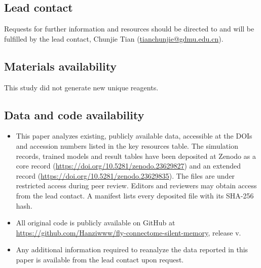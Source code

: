 \subsection{Lead contact}
Requests for further information and resources should be directed to and will be fulfilled by the lead contact, Chunjie Tian
(\href{mailto:tianchunjie@gdmu.edu.cn}{tianchunjie@gdmu.edu.cn}).

\subsection{Materials availability}
This study did not generate new unique reagents.

\subsection{Data and code availability}
\begin{itemize}
  \item This paper analyzes existing, publicly available data, accessible at the DOIs and accession numbers listed in the key
  resources table. The simulation records, trained models and result tables have been deposited at Zenodo as a core record
  (\url{https://doi.org/10.5281/zenodo.23629827}) and an extended record (\url{https://doi.org/10.5281/zenodo.23629835}). The files are under restricted access
  during peer review. Editors and reviewers may obtain access from the lead contact. A manifest lists every deposited file
  with its SHA-256 hash.
  \item All original code is publicly available on GitHub at \url{https://github.com/Hanziwww/fly-connectome-silent-memory}, release v.
  \item Any additional information required to reanalyze the data reported in this paper is available from the lead contact
  upon request.
\end{itemize}
